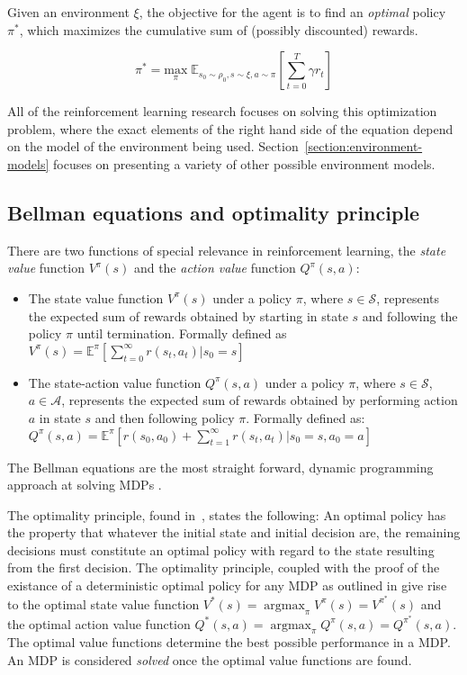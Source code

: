 \documentclass{../main.tex}{}
\begin{document}
Given an environment $\xi$, the objective for the agent is to find an \textit{optimal} policy $\pi^*$, which maximizes the cumulative sum of (possibly discounted) rewards.

\begin{equation}
    \pi^{*} = \underset{\pi}{\text{max}}\;  \mathbb{E}_{s_0 \sim \rho_0, s \sim \xi, a \sim \pi}[\sum_{t=0}^{T} \gamma r_t]
    \label{equation:expected-cumulative-reward}
\end{equation}

All of the reinforcement learning research focuses on solving this optimization problem, where the exact elements of the right hand side of the equation depend on the model of the environment being used. Section~\ref{section:environment-models} focuses on presenting a variety of other possible environment models.

\subsection{Bellman equations and optimality principle}

There are two functions of special relevance in reinforcement learning, the \textit{state value} function $V^{\pi}(s)$ and the \textit{action value} function $Q^{\pi}(s, a)$:
\begin{itemize}
\item The state value function $V^{\pi}(s)$ under a policy $\pi$, where $s \in \mathcal{S}$, represents the expected sum of rewards obtained by starting in state $s$ and following the policy $\pi$ until termination. Formally defined as $V^{\pi}(s) = \mathbb{E}^{\pi}[\sum^{\infty}_{t=0} r(s_t, a_t) | s_0 = s] $
\item The state-action value function $Q^{\pi}(s, a)$ under a policy $\pi$, where $s \in \mathcal{S}$, $a \in \mathcal{A}$, represents the expected sum of rewards obtained by performing action $a$ in state $s$ and then following policy $\pi$. Formally defined as: $Q^{\pi}(s, a) = \mathbb{E}^{\pi}[r(s_0, a_0) + \sum^{\infty}_{t=1} r(s_t, a_t) | s_0 = s, a_0 = a]$
\end{itemize}

The Bellman equations are the most straight forward, dynamic programming approach at solving MDPs \citep{Bertsekas2007, Bellman1957}.


The optimality principle, found in~\cite{Bellman1957}, states the following: An optimal policy has the property that whatever the initial state and initial decision are, the remaining decisions must constitute an optimal policy with regard to the state resulting from the first decision. The optimality principle, coupled with the proof of the existance of a deterministic optimal policy for any MDP as outlined in \citep{Borkar1988} give rise to the optimal state value function $V^{*}(s) = \operatorname*{argmax}_{\pi} V^{\pi}(s) = V^{\pi^{*}}(s)$ and the optimal action value function $Q^{*}(s,a) = \operatorname*{argmax}_{\pi} Q^{\pi}(s, a) = Q^{\pi^{*}}(s, a)$. The optimal value functions determine the best possible performance in a MDP\@. An MDP is considered \textit{solved} once the optimal value functions are found. 
\end{document}
